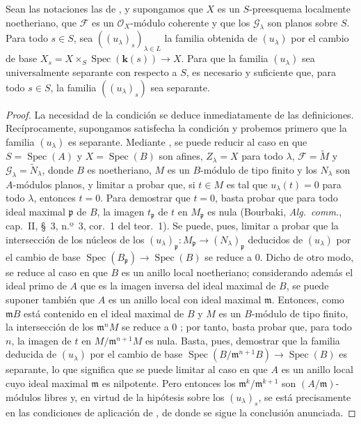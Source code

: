 \begin{theorem}[11.9.16]
\label{IV.11.9.16}
Sean las notaciones las de , y supongamos que $X$ es un $S$-preesquema localmente noetheriano, que $\mathcal F$ es un $\mathcal O_X$-módulo coherente y que los $\mathcal G_\lambda$ son planos sobre $S$.
Para todo $s\in S$, sea $((u_\lambda)_s)_{\lambda\in L}$ la familia obtenida de $(u_\lambda)$ por el cambio de base $X_s=X\times_S\operatorname{Spec}(\boldsymbol{k}(s))\to X$.
Para que la familia $(u_\lambda)$ sea universalmente separante con respecto a $S$, es necesario y suficiente que, para todo $s\in S$, la familia $((u_\lambda)_s)$ sea separante.
\end{theorem}

\begin{proof}
La necesidad de la condición se deduce inmediatamente de las definiciones.
Recíprocamente, supongamos satisfecha la condición y probemos primero que la familia $(u_\lambda)$ es separante.
Mediante , se puede reducir al caso en que $S=\operatorname{Spec}(A)$ y $X=\operatorname{Spec}(B)$ son afines, $Z_\lambda=X$ para todo $\lambda$, $\mathcal F=\widetilde M$ y $\mathcal G_\lambda=\widetilde N_\lambda$, donde $B$ es noetheriano, $M$ es un $B$-módulo de tipo finito y los $N_\lambda$ son $A$-módulos planos, y limitar a probar que, si $t\in M$ es tal que $u_\lambda(t)=0$ para todo $\lambda$, entonces $t=0$.
Para demostrar que $t=0$, basta probar que para todo ideal maximal $\mathfrak p$ de $B$, la imagen $t_\mathfrak p$ de $t$ en $M_\mathfrak p$ es nula (Bourbaki, \emph{Alg.\ comm.}, cap.~II, \S~3, n.º~3, cor.~1 del teor.~1).
Se puede, pues, limitar a probar que la intersección
de los núcleos de los $(u_\lambda)_\mathfrak p:M_\mathfrak p\to(N_\lambda)_\mathfrak p$ deducidos de $(u_\lambda)$ por el cambio de base $\operatorname{Spec}(B_\mathfrak p)\to\operatorname{Spec}(B)$ se reduce a 0.
Dicho de otro modo, se reduce al caso en que $B$ es un anillo local noetheriano; considerando además el ideal primo de $A$ que es la imagen inversa del ideal maximal de $B$, se puede suponer también que $A$ es un anillo local con ideal maximal $\mathfrak m$.
Entonces, como $\mathfrak mB$ está contenido en el ideal maximal de $B$ y $M$ es un $B$-módulo de tipo finito, la intersección de los $\mathfrak m^nM$ se reduce a 0 ; por tanto, basta probar que, para todo $n$, la imagen de $t$ en $M/\mathfrak m^{n+1}M$ es nula.
Basta, pues, demostrar que la familia deducida de $(u_\lambda)$ por el cambio de base $\operatorname{Spec}(B/\mathfrak m^{n+1}B)\to\operatorname{Spec}(B)$ es separante, lo que significa que se puede limitar al caso en que $A$ es un anillo local cuyo ideal maximal $\mathfrak m$ es nilpotente.
Pero entonces los $\mathfrak m^k/\mathfrak m^{k+1}$ son $(A/\mathfrak m)$-módulos libres y, en virtud de la hipótesis sobre los $(u_\lambda)_s$, se está precisamente en las condiciones de aplicación de , de donde se sigue la conclusión anunciada.


\end{proof}
